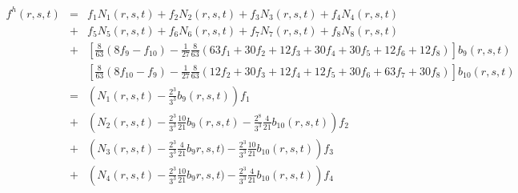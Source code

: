 \begin{eqnarray}
f^h(r,s,t) 
&=& f_1 N_1(r,s,t) + f_2 N_2(r,s,t) + f_3 N_3(r,s,t) + f_4 N_4(r,s,t) \nonumber\\
&+& f_5 N_5(r,s,t) + f_6 N_6(r,s,t) + f_7 N_7(r,s,t) +f_8 N_8(r,s,t) \nonumber\\
&+& \left[\frac{8}{63}(8{f}_{9}-{f}_{10})-\frac{1}{27}\frac{8}{63}  ( 63 f_1 +30 f_2 +12 f_3  +30f_4 +30f_5 +12f_6 +12f_8) \right] b_9(r,s,t) \nonumber\\
&&\left[ \frac{8}{63}(8 {f}_{10}-{f}_9)  -\frac{1}{27}\frac{8}{63} (12f_2 + 30f_3 + 12f_4 +12f_5 + 30f_6 + 63f_7 +30f_8) \right] b_{10}(r,s,t) \nonumber\\
&=& \left(N_1(r,s,t) - \frac{2^3}{3^3}b_9(r,s,t) \right) f_1 \nonumber\\
&+& \left(N_2(r,s,t) - \frac{2^3}{3^3}\frac{10}{21} b_9(r,s,t) - \frac{2^8}{3^3}\frac{4}{21} b_{10}(r,s,t)  \right) f_2 \nonumber\\
&+&\left( N_3(r,s,t)  -\frac{2^3}{3^3}\frac{4}{21} b_9r,s,t) -\frac{2^3}{3^3}\frac{10}{21} b_{10}(r,s,t)  \right)f_3 \nonumber\\
&+& \left( N_4(r,s,t) -\frac{2^3}{3^3}\frac{10}{21} b_{9}r,s,t) -\frac{2^3}{3^3}\frac{4}{21} b_{10}(r,s,t)\right)f_4 \nonumber\\ 

\end{eqnarray}
